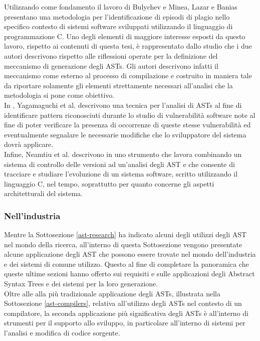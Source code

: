 Utilizzando come fondamento il lavoro di Bulychev e Minea, Lazar e Banias
presentano una metodologia \cite{DBLP:conf/saci/LazarB14} per l’identificazione
di episodi di plagio nello specifico contesto di sistemi software sviluppati
utilizzando il linguaggio di programmazione C. Uno degli elementi di maggiore
interesse esposti da questo lavoro, rispetto ai contenuti di questa tesi, è
rappresentato dallo studio che i due autori descrivono rispetto alle
riflessioni operate per la definizione del meccanismo di generazione degli
ASTs. Gli autori descrivono infatti il meccanismo come esterno al processo di
compilazione e costruito in maniera tale da riportare solamente gli elementi
strettamente necessari all’analisi che la metodologia si pone come obiettivo.\\

In \cite{DBLP:conf/acsac/YamaguchiLR12}, Yagamaguchi et al. descrivono una
tecnica per l’analisi di ASTs al fine di identificare pattern riconosciuti
durante lo studio di vulnerabilità software note al fine di poter verificare la
presenza di occorrenze di queste stesse vulnerabilità ed eventualmente
segnalare le necessarie modifiche che lo sviluppatore del sistema dovrà
applicare.\\

Infine, Neamtiu et al. descrivono in \cite{DBLP:journals/sigsoft/NeamtiuFH05}
uno strumento che lavora combinando un sistema di controllo delle versioni ad
un’analisi degli AST e che consente di tracciare e studiare l’evoluzione di un
sistema software, scritto utilizzando il linguaggio C, nel tempo, soprattutto
per quanto concerne gli aspetti architetturali del sistema.

\subsubsection{Nell’industria}

Mentre la Sottosezione \ref{ast-research} ha indicato alcuni degli utilizzi
degli AST nel mondo della ricerca, all’interno di questa Sottosezione vengono
presentate alcune applicazione degli AST che possono essere trovate nel mondo
dell’industria e dei sistemi di comune utilizzo. Questo al fine di completare la
panoramica che queste ultime sezioni hanno offerto sui requisiti e sulle
applicazioni degli Abstract Syntax Trees e dei sistemi per la loro
generazione.\\

Oltre alle alla più tradizionale applicazione degli ASTs, illustrata nella
Sottosezione \ref{ast-compilers}, relativa all’utilizzo degli ASTs nel contesto
di un compilatore, la seconda applicazione più significativa degli ASTs è
all’interno di strumenti per il supporto allo sviluppo, in particolare
all’interno di sistemi per l'analisi e modifica di codice sorgente.\\


